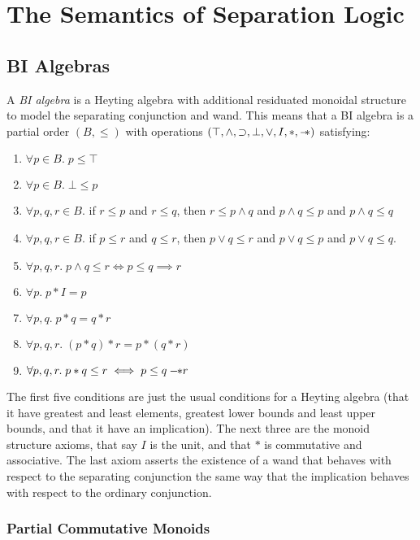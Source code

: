 \chapter{The Semantics of Separation Logic}

\section{BI Algebras}

A \emph{BI algebra} is a Heyting algebra with additional residuated
monoidal structure to model the separating conjunction and wand. This
means that a BI algebra is a partial order $(B, \leq)$ with
operations $(\top, \land, \supset, \bot, \vee, I, *, -\!\!*)$
satisfying:

\begin{enumerate}
\item $\forall p \in B.\; p \leq \top$
\item $\forall p \in B.\; \bot \leq p$
\item $\forall p,q,r \in B.$ if $r \leq p$ and $r \leq q$, then
      $r \leq p \land q$ and 
      $p \land q \leq p$ and $p \land q \leq q$
\item $\forall p,q,r \in B.$ if $p \leq r$ and $q \leq r$, then
      $p \vee q \leq r$ and
      $p \vee q \leq p$ and $p \vee q \leq q$.
\item $\forall p, q, r.\; p \land q \leq r \iff p \leq q \implies r$
\item $\forall p.\; p * I = p$
\item $\forall p, q.\; p * q = q * r$
\item $\forall p, q, r.\; (p * q) * r = p * (q * r)$
\item $\forall p, q, r.\; p * q \leq r \iff p \leq q -\!\!* r$
\end{enumerate}

The first five conditions are just the usual conditions for a Heyting
algebra (that it have greatest and least elements, greatest lower
bounds and least upper bounds, and that it have an implication). The
next three are the monoid structure axioms, that say $I$ is the unit,
and that $*$ is commutative and associative. The last axiom asserts
the existence of a wand that behaves with respect to the separating
conjunction the same way that the implication behaves with respect to
the ordinary conjunction.

\subsection{Partial Commutative Monoids}

